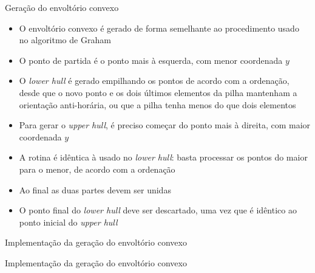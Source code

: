 \begin{frame}[fragile]{Geração do envoltório convexo}

    \begin{itemize}
        \item O envoltório convexo é gerado de forma semelhante ao procedimento usado no 
            algoritmo de Graham
        \pause

        \item O ponto de partida é o ponto mais à esquerda, com menor coordenada $y$
        \pause

        \item O \textit{lower hull} é gerado empilhando os pontos de acordo com a ordenação,
            desde que o novo ponto e os dois últimos elementos da pilha mantenham a orientação 
            anti-horária, ou que a pilha tenha menos do que dois elementos
        \pause

        \item Para gerar o \textit{upper hull}, é preciso começar do ponto mais à direita, com
            maior coordenada $y$
        \pause

        \item A rotina é idêntica à usado no \textit{lower hull}: basta processar os pontos
            do maior para o menor, de acordo com a ordenação
        \pause

        \item Ao final as duas partes devem ser unidas
        \pause

        \item O ponto final do \textit{lower hull} deve ser descartado, uma vez que é idêntico
            ao ponto inicial do \textit{upper hull} 

    \end{itemize}

\end{frame}



\begin{frame}[fragile]{Implementação da geração do envoltório convexo}
\end{frame}

\begin{frame}[fragile]{Implementação da geração do envoltório convexo}
\end{frame}
